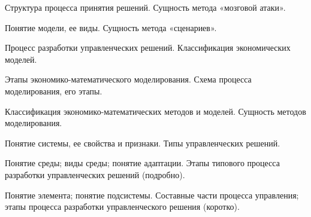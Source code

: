 \documentclass[
	14pt,
	a4paper,
	]
	{scrartcl}
\begin{document}
\shapk
{}
\setcounter{zad}{0}

\vfill
\z Структура процесса принятия решений.
 \vfill
\z Сущность метода «мозговой атаки».
 \vfill

\vfill

\newpage


\shapk
{}
\setcounter{zad}{0}

\vfill
\z Понятие модели, ее виды.
 \vfill
\z Сущность метода «сценариев».
 \vfill

\vfill

\newpage


\shapk
{}
\setcounter{zad}{0}

\vfill
\z Процесс разработки управленческих решений.
 \vfill
\z Классификация экономических моделей.
 \vfill

\vfill

\newpage


\shapk
{}
\setcounter{zad}{0}

\vfill
\z Этапы экономико-математического моделирования.
 \vfill
\z Схема процесса моделирования, его этапы.
 \vfill

\vfill

\newpage


\shapk
{}
\setcounter{zad}{0}

\vfill
\z Классификация экономико-математических методов и моделей.
 \vfill
\z Сущность методов моделирования.
 \vfill

\vfill

\newpage


\shapk
{}
\setcounter{zad}{0}

\vfill
\z Понятие системы, ее свойства и признаки.
 \vfill
\z Типы управленческих решений.
 \vfill

\vfill

\newpage


\shapk
{}
\setcounter{zad}{0}

\vfill
\z Понятие среды; виды среды; понятие адаптации.
 \vfill
\z Этапы типового процесса разработки управленческих решений (подробно).
 \vfill

\vfill

\newpage


\shapk
{}
\setcounter{zad}{0}

\vfill
\z Понятие элемента; понятие подсистемы.
 \vfill
\z Составные части процесса управления; этапы процесса разработки управленческого решения (коротко).
 \vfill
\end{document}
